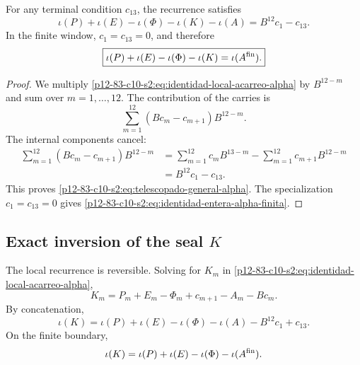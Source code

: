 \begin{theorem}
\label{p12-83-c10-s2:thm:telescopado-acarreos-alpha}
For any terminal condition \(c_{13}\), the recurrence satisfies
\begin{equation}
 \boxed{
 \iota(P)+\iota(E)-\iota(\Phi)-\iota(K)-\iota(A)
 =B^{12}c_1-c_{13}.}
 \label{p12-83-c10-s2:eq:telescopado-general-alpha}
\end{equation}
In the finite window, \(c_1=c_{13}=0\), and therefore
\begin{equation}
 \boxed{
 \iota(P)+\iota(E)-\iota(\Phi)-\iota(K)
 =\iota(A^{\rm fin}).}
 \label{p12-83-c10-s2:eq:identidad-entera-alpha-finita}
\end{equation}
\end{theorem}

\begin{proof}
We multiply \eqref{p12-83-c10-s2:eq:identidad-local-acarreo-alpha} by
\(B^{12-m}\) and sum over \(m=1,\ldots,12\). The contribution of the carries is
\[
 \sum_{m=1}^{12}
 (Bc_m-c_{m+1})B^{12-m}.
\]
The internal components cancel:
\begin{align*}
 \sum_{m=1}^{12}(Bc_m-c_{m+1})B^{12-m}
 &=\sum_{m=1}^{12}c_mB^{13-m}
   -\sum_{m=1}^{12}c_{m+1}B^{12-m}\\
 &=B^{12}c_1-c_{13}.
\end{align*}
This proves \eqref{p12-83-c10-s2:eq:telescopado-general-alpha}. The specialization
\(c_1=c_{13}=0\) gives \eqref{p12-83-c10-s2:eq:identidad-entera-alpha-finita}.
\end{proof}

\subsection{Exact inversion of the seal \texorpdfstring{\(K\)}{K}}

The local recurrence is reversible. Solving for \(K_m\) in
\eqref{p12-83-c10-s2:eq:identidad-local-acarreo-alpha},
\begin{equation}
 \boxed{
 K_m=P_m+E_m-\Phi_m+c_{m+1}-A_m-Bc_m.}
 \label{p12-83-c10-s2:eq:inversion-local-k-desde-alpha}
\end{equation}
By concatenation,
\begin{equation}
 \boxed{
 \iota(K)
 =\iota(P)+\iota(E)-\iota(\Phi)-\iota(A)
  -B^{12}c_1+c_{13}.}
 \label{p12-83-c10-s2:eq:inversion-concatenada-k-desde-alpha}
\end{equation}
On the finite boundary,
\[
 \iota(K)
 =\iota(P)+\iota(E)-\iota(\Phi)-\iota(A^{\rm fin}).
\]

